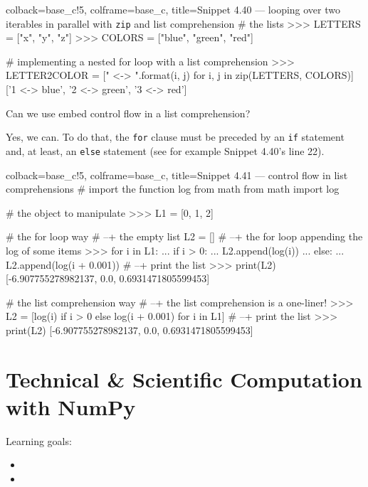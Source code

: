 \documentclass[a4paper,11pt]{book}
\numberwithin{figure}{chapter}
\numberwithin{table}{chapter}
\newcommand{\question}[1]{%
    \begin{tcolorbox}[colback=comp_c!10,colframe=comp_c,sidebyside align=top,width=\linewidth,before skip=1ex]
        #1
    \end{tcolorbox}
    \switchcolumn%
}
\newcommand{\note}[1]{%
    \begin{tcolorbox}[colback=white!0,colframe=white!10,width=\linewidth,before skip=1ex]
        #1
    \end{tcolorbox}
}
\begin{document}
\begin{pythoncode}[linenos=true,]{colback=base_c!5, colframe=base_c, title=\sffamily Snippet 4.40 ---  looping over two iterables in parallel with \texttt{zip} and list comprehension}
# the lists 
>>> LETTERS = ["x", "y", "z"]
>>> COLORS = ["blue", "green", "red"]

# implementing a nested for loop with a list comprehension
>>> LETTER2COLOR = ["{} <-> {}".format(i, j) for i, j in zip(LETTERS, COLORS)]
['1 <-> blue', '2 <-> green', '3 <-> red']
\end{pythoncode}

\begin{paracol}{2}
	\question{\raggedright Can we use embed control flow in a list comprehension?}
	\note{Yes, we can. To do that, the \texttt{for} clause must be preceded by an \texttt{if} statement and, at least, an \texttt{else} statement (see for example Snippet 4.40's line 22). }
\end{paracol}

\begin{pythoncode}[linenos=true,]{colback=base_c!5, colframe=base_c, title=\sffamily Snippet 4.41 --- control flow in list comprehensions}
# import the function log from math 
from math import log

# the object to manipulate
>>> L1 = [0, 1, 2]

# the for loop way
# --+ the empty list 
L2 = []
# --+ the for loop appending the log of some items
>>> for i in L1:
...     if i > 0:
...         L2.append(log(i))
...     else:
...         L2.append(log(i + 0.001))
# --+ print the list
>>> print(L2)
[-6.907755278982137, 0.0, 0.6931471805599453]

# the list comprehension way
# --+ the list comprehension is a one-liner!
>>> L2 = [log(i) if i > 0 else log(i + 0.001) for i in L1]
# --+ print the list
>>> print(L2)
[-6.907755278982137, 0.0, 0.6931471805599453]
\end{pythoncode}

\theendnotes

\chapter{Technical \& Scientific Computation with NumPy}

\vspace{1em}

Learning goals:

\begin{itemize}
	\item 
	\item 
\end{itemize}
\end{document}
